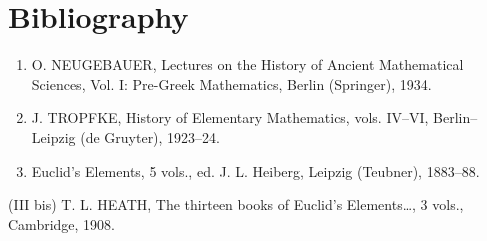 \section*{Bibliography}
{}

\begin{enumerate}
\def\labelenumi{(\Roman{enumi})}
\item
  O. NEUGEBAUER, Lectures on the History of Ancient Mathematical Sciences, Vol. I: Pre-Greek Mathematics, Berlin (Springer), 1934.
\item
  J. TROPFKE, History of Elementary Mathematics, vols. IV–VI, Berlin–Leipzig (de Gruyter), 1923–24.
\item
  Euclid's Elements, 5 vols., ed. J. L. Heiberg, Leipzig (Teubner), 1883–88.
\end{enumerate}

(III bis) T. L. HEATH, The thirteen books of Euclid's Elements\ldots, 3 vols., Cambridge, 1908.

